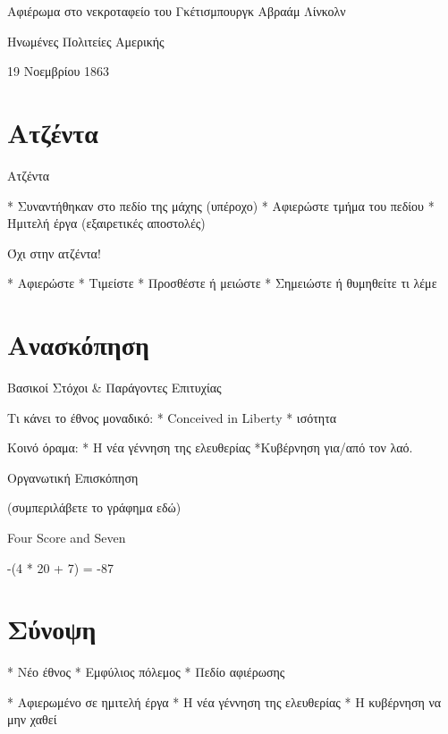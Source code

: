 \documentclass{beamer}
\newcommand{\gr}{\selectlanguage{greek}}
\begin{document}
\gr
Αφιέρωμα στο νεκροταφείο του Γκέτισμπουργκ
Αβραάμ Λίνκολν

Ηνωμένες Πολιτείες Αμερικής

19 Νοεμβρίου 1863

\section{Ατζέντα}

Ατζέντα

  * Συναντήθηκαν στο πεδίο της μάχης (υπέροχο)
  * Αφιερώστε τμήμα του πεδίου
  * Ημιτελή έργα (εξαιρετικές αποστολές)

Όχι στην ατζέντα!

  * Αφιερώστε
   * Τιμείστε 
   * Προσθέστε ή μειώστε
   * Σημειώστε ή θυμηθείτε τι λέμε

\section{Ανασκόπηση}

Βασικοί Στόχοι \& Παράγοντες Επιτυχίας

Τι κάνει το έθνος μοναδικό:
  * \textlatin{Conceived in Liberty}
  * ισότητα

Κοινό όραμα:
  * Η νέα γέννηση της ελευθερίας
  *Κυβέρνηση για/από τον λαό.

Οργανωτική Επισκόπηση

(συμπεριλάβετε το γράφημα εδώ)

\textlatin{Four Score and Seven}

-(4 * 20 + 7) = -87

\section{Σύνοψη}

* Νέο έθνος
* Εμφύλιος πόλεμος
* Πεδίο αφιέρωσης

* Αφιερωμένο σε ημιτελή έργα
* Η νέα γέννηση της ελευθερίας
* Η κυβέρνηση να μην χαθεί
\end{document}
